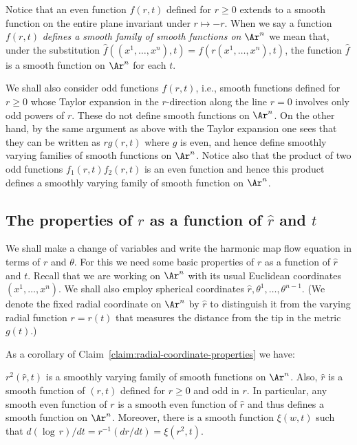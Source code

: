 Notice that an even function $f(r,t)$ defined for $r\ge 0$ extends
to a smooth function on the entire plane invariant under $r\mapsto
-r$. When we say a function $f(r,t)$ {\em defines a smooth family of
smooth functions on $\Ar^n$} we mean that, under the substitution
$\hat f((x^1,\ldots,x^n),t)=f(r(x^1,\ldots,x^n),t)$, the function
$\hat f$ is a smooth function on $\Ar^n$ for each $t$.

We shall also consider odd functions $f(r,t)$, i.e., smooth
functions defined for $r\ge 0$ whose Taylor expansion in the
$r$-direction along the line $r=0$ involves only odd powers of $r$.
These do not define smooth functions on $\Ar^n$. On the other hand,
by the same argument as above with the Taylor expansion one sees
that they can be written as $rg(r,t)$ where $g$ is even, and hence
define  smoothly varying families of smooth functions on $\Ar^n$.
Notice also that the product of two odd functions $f_1(r,t)f_2(r,t)$
is an even function and hence this product defines a smoothly
varying family of smooth function on $\Ar^n$.


\subsection{The properties of $r$ as a function of $\hat r$ and $t$}

We shall make a change of variables and write the harmonic map flow
equation in terms of $r$ and $\theta$. For this we need some basic
properties of $r$ as a function of $\hat r$ and $t$. Recall that we
are working on $\Ar^n$ with its usual Euclidean coordinates
$(x^1,\ldots,x^n)$. We shall also employ spherical coordinates $\hat
r,\theta^1,\ldots,\theta^{n-1}$. (We denote the fixed radial
coordinate on $\Ar^n$ by $\hat r$ to distinguish it from the varying
radial function $r=r(t)$ that measures the distance from the tip in
the metric $g(t)$.)

As a corollary of Claim~\ref{claim:radial-coordinate-properties} we have:

\begin{corollary}
\label{cor:r-squared-smooth-function}
\label{rcor}
$r^2(\hat r,t)$ is a smoothly varying family of smooth functions on
$\Ar^n$. Also, $\hat r$ is a smooth  function of $(r,t)$ defined for
$r\ge 0$ and odd in $r$. In particular, any smooth even function of
$r$ is a smooth even function of $\hat r$ and thus defines a smooth
function on $\Ar^n$. Moreover, there is a smooth function $\xi(w,t)$
such that $d(\log\, r)/dt=r^{-1}(dr/dt)=\xi(r^2,t)$.
\end{corollary}

